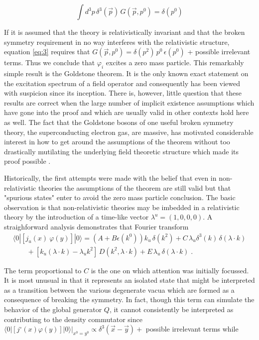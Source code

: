 \documentclass[%
  12pt,
  paper=letter,
  abstracton,
  pagesize=auto,
  version=last,
  DIV=calc
  ]{scrartcl}
\begin{document}
\begin{equation}
  \label{eq:3}
  \int d^{3}p\, \delta^{3}(\vec{p})\, G(\vec{p}, p^{0}) = \delta(p^{0})
\end{equation}

If it is assumed that the theory is relativistically invariant and
that the broken symmetry requirement in no way interferes with the
relativistic structure, equation \eqref{eq:3} requires that $G(\vec{p},
p^{0}) = \delta(p^{2})\, p^{0}\, \epsilon(p^{0})$ + possible
irrelevant terms.  Thus we conclude that $\varphi_i$ excites a zero
mass particle.  This remarkably simple result is the Goldstone
theorem.  It is the only known exact statement on the excitation
spectrum of a field operator and consequently has been viewed with
suspicion since its inception.  There is, however, little question
that these results are correct when the large number of implicit
existence assumptions which have gone into the proof and which are
usually valid in other contexts hold here as well.  The fact that the
Goldstone bosons of one useful broken symmetry theory, the
superconducting electron gas, are massive, has motivated considerable
interest in how to get around the assumptions of the theorem without
too drastically mutilating the underlying field theoretic structure
which made its proof possible \cite{5}.

Historically, the first attempts were made with the belief that even
in non-relativistic theories the assumptions of the theorem are still
valid but that "spurious states" enter to avoid the zero mass particle
conclusion.  The basic observation \cite{6} is that non-relativistic
theories may be imbedded in a relativistic theory by the introduction
of a time-like vector $\lambda^{u}=(1,0,0,0)$.  A straighforward
analysis demonstrates that Fourier transform
\begin{multline*}
  \langle 0 |\left[j_{u}
  (x)~\varphi(y)\right]| 0\rangle = (A + B\epsilon(k^{0}))k_{u}\,
  \delta(k^{2}) + C\, \lambda_{u}
  \delta^{3}(k)\, \delta(\lambda\cdot k) \\
  \qquad + [k_{u}(\lambda\cdot
  k) - \lambda_{u}k^{2}]\, D (k^{2}, \lambda\cdot
  k) + E\, \lambda_{u}\, \delta(\lambda\cdot k) \; .
\end{multline*}

The term proportional to $C$ is the one on which attention was
initially focussed. It is most unusual in that it represents an
isolated state that might be interpreted as a transition between the
various degenerate vacua which are formed as a consequence of breaking
the symmetry.  In fact, though this term can simulate the behavior of
the global generator $Q$, it cannot consistently be interpreted as
contributing to the density commutator since
$\langle 0 |[{j^{\circ}}(x)\varphi(y)]|0\rangle\big|_{{x^{0}=y^{0}}}
\propto \delta^3(\vec{x}-\vec{y}) +$ possible irrelevant terms
while
\end{document}
